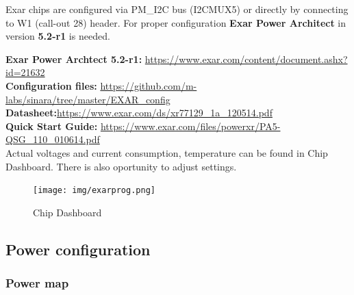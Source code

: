 Exar chips are configured via PM\_I2C bus (I2CMUX5) or directly by connecting to W1 (call-out 28) header. For proper configuration \textbf{Exar Power Architect} in version \textbf{5.2-r1} is needed.

\noindent
\textbf{Exar Power Archtect 5.2-r1:}
\href{https://www.exar.com/content/document.ashx?id=21632}{https://www.exar.com/content/document.ashx?id=21632}\\
\textbf{Configuration files:}
\href{https://github.com/m-labs/sinara/tree/master/EXAR\_config}{https://github.com/m-labs/sinara/tree/master/EXAR\_config}\\
\textbf{Datasheet:}\href{https://www.exar.com/ds/xr77129_1a_120514.pdf}{https://www.exar.com/ds/xr77129\_1a\_120514.pdf}\\
\textbf{Quick Start Guide:} \href{https://www.exar.com/files/powerxr/PA5-QSG_110_010614.pdf}{https://www.exar.com/files/powerxr/PA5-QSG\_110\_010614.pdf}\\


Actual voltages and current consumption, temperature can be found in Chip Dashboard. There is also oportunity to adjust settings.

\begin{figure}[htbp!]
	\centering
	\texttt{[image: img/exarprog.png]}\\
	\caption{Chip Dashboard} 
\end{figure}


\subsection{Power configuration} 

\subsubsection{Power map}


